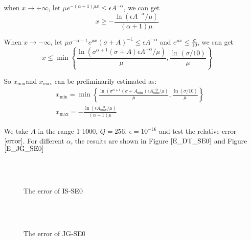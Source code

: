 when $x\rightarrow +\infty$, let $\mu e^{-(\alpha+1)\mu x}\leq \epsilon A^{-\alpha}$, we can get
\begin{equation}
x\geq -\frac{\ln(\epsilon A^{-\alpha}/\mu)}{(\alpha+1)\mu}
\end{equation}

When $x\rightarrow -\infty$, let $\mu\sigma^{-\alpha-1}e^{\mu x}(\sigma+A)^{-1}\leq \epsilon A^{-\alpha}$ and $e^{\mu x}\le \frac{\sigma}{10}$, we can get
\begin{equation}
x\leq \min \left\{\frac{\ln(\sigma^{\alpha+1}(\sigma+A)\epsilon A^{-\alpha}/\mu)}{\mu},\frac{\ln(\sigma/10)}{\mu}\right\}
\end{equation}

So  $x_{\min}$and $x_{\max}$ can be preliminarily estimated as:
\begin{equation}
\begin{aligned}
&x_{\min}= \min \left\{\frac{\ln(\sigma^{\alpha+1}(\sigma+A_{\min})\epsilon A_{\min}^{-\alpha}/\mu)}{\mu},\frac{\ln(\sigma/10)}{\mu}\right\}\\
&x_{\max}=-\frac{\ln(\epsilon A_{\max}^{-\alpha}/\mu)}{(\alpha+1)\mu}
\end{aligned}
\end{equation}

We take $A$ in the range 1-1000, $Q=256$,  $\epsilon=10^{-16}$ and test the relative error $\eqref{error}$. For different $\alpha $, the results are shown in Figure $\ref{E_DT_SE0}$ and Figure $\ref{E_JG_SE0}$

\begin{figure}[htbp]
\centering
{}
~~
~~
\\
~~
~~
  \caption{The error of IS-SE0}
  \label{E_DT_SE0}
\end{figure}

\begin{figure}[htbp]
\centering
{}
~~
~~
\\
~~
~~
  \caption{The error of JG-SE0}
   \label{E_JG_SE0}
\end{figure}
 

